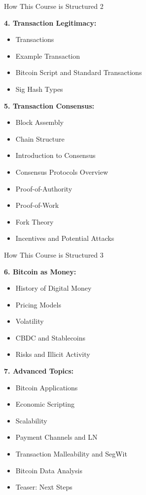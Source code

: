 \documentclass[]{beamer}
\begin{document}
\begin{frame}{How This Course is Structured 2}
\footnotesize	

\textbf{4. Transaction Legitimacy:}
	\begin{itemize}
		\item Transactions
		\item Example Transaction
		\item Bitcoin Script and Standard Transactions
		\item Sig Hash Types
	\end{itemize}	

\vspace{0.5em}

\textbf{5. Transaction Consensus:}
	\begin{itemize}
		\item Block Assembly
		\item Chain Structure
		\item Introduction to Consensus
		\item Consensus Protocols Overview
		\item Proof-of-Authority
		\item Proof-of-Work
		\item Fork Theory
		\item Incentives and Potential Attacks
	\end{itemize}	

\end{frame}


\begin{frame}{How This Course is Structured 3}
\footnotesize	

\textbf{6. Bitcoin as Money:}
	\begin{itemize}
		\item History of Digital Money
		\item Pricing Models
		\item Volatility
		\item CBDC and Stablecoins
		\item Risks and Illicit Activity
	\end{itemize}	

\vspace{0.5em}

\textbf{7. Advanced Topics:}
	\begin{itemize}
		\item Bitcoin Applications
		\item Economic Scripting
		\item Scalability
		\item Payment Channels and LN
		\item Transaction Malleability and SegWit
		\item Bitcoin Data Analysis
		\item Teaser: Next Steps
	\end{itemize}	

\end{frame}
\end{document}
